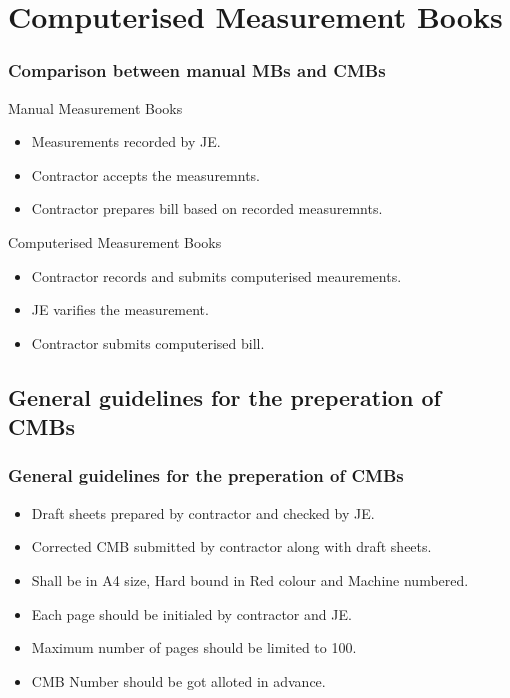 \documentclass{beamer}
\begin{document}
\section{Computerised Measurement Books}
\begin{frame}
  \frametitle{Comparison between manual MBs and CMBs}
  \begin{block}{Manual Measurement Books}
    \begin{itemize}
      \item<2-> Measurements recorded by JE.
      \item<3-> Contractor accepts the measuremnts.
      \item<4-> Contractor prepares bill based on recorded measuremnts.
    \end{itemize}
  \end{block}
  \begin{block}{Computerised Measurement Books}
    \begin{itemize}
      \item<2-> Contractor records and submits computerised meaurements.
      \item<3-> JE varifies the measurement.
      \item<4-> Contractor submits computerised bill.
    \end{itemize}
  \end{block}
\end{frame}
  
\subsection{General guidelines for the preperation of CMBs}
\begin{frame}
  \frametitle{General guidelines for the preperation of CMBs}
  \begin{itemize}[<+->]
    \item Draft sheets prepared by contractor and checked by JE.
    \item Corrected CMB submitted by contractor along with draft sheets.
    \item Shall be in A4 size, Hard bound in Red colour and Machine numbered.
    \item Each page should be initialed by contractor and JE.
    \item Maximum number of pages should be limited to 100.
    \item CMB Number should be got alloted in advance.
  \end{itemize}
\end{frame}
\end{document}
